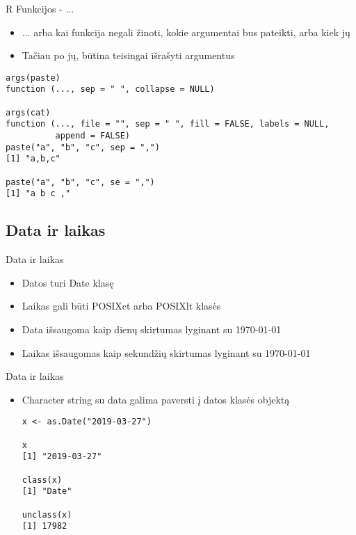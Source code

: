 \documentclass[11pt,xcolor=table]{beamer}
\begin{document}

\begin{frame}[fragile]{R Funkcijos - ...}
\begin{itemize}
\item ...  arba kai funkcija negali žinoti, kokie argumentai bus pateikti, arba kiek jų
\item Tačiau po jų, būtina teisingai išrašyti argumentus

\end{itemize}
\begin{lstlisting}
args(paste)
function (..., sep = " ", collapse = NULL) 

args(cat)
function (..., file = "", sep = " ", fill = FALSE, labels = NULL, 
          append = FALSE) 
paste("a", "b", "c", sep = ",")
[1] "a,b,c"

paste("a", "b", "c", se = ",")
[1] "a b c ,"
\end{lstlisting}
\end{frame}

\subsection{Data ir laikas}

\begin{frame}[fragile]{Data ir laikas}
\begin{itemize}
\item Datos turi Date klasę
\item Laikas gali būti POSIXct arba POSIXlt klasės
\item Data išsaugoma kaip dienų skirtumas lyginant su 1970-01-01
\item Laikas išsaugomas kaip sekundžių skirtumas lyginant su 1970-01-01
\end{itemize}
\end{frame}


\begin{frame}[fragile]{Data ir laikas}
\begin{itemize}
\item Character string su data galima paversti į datos klasės objektą
\begin{lstlisting}
x <- as.Date("2019-03-27")

x
[1] "2019-03-27"

class(x)
[1] "Date"

unclass(x)
[1] 17982
\end{lstlisting}
\end{itemize}
\end{frame}
\end{document}
